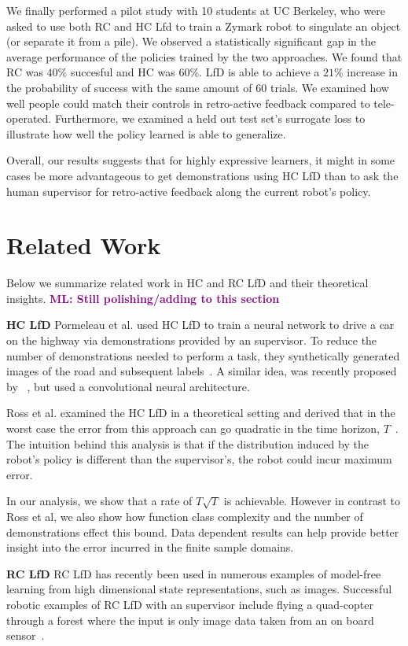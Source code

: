 \documentclass[10pt, conference]{ieeeconf}      %
\newcommand{\ns}{HC LfD }
\newcommand{\nc}{RC LfD }
\newcommand{\mlnote}[1]{\ifthenelse{ \boolean{include-notes}}%
 {\textcolor{purple}{\textbf{ML: #1}}}{}}
\begin{document}
We finally performed a pilot study with 10 students at UC Berkeley, who were asked to use both RC and HC Lfd to train a Zymark robot to singulate an object (or separate it from a pile). We observed a statistically significant gap in the average performance of the policies trained by the two approaches. We found that RC was $40\%$ succesful and HC was $60\%$.  LfD is able to achieve a $21 \%$ increase in the probability of success with the same amount of $60$ trials. We examined how well people could match their controls in retro-active feedback compared to tele-operated. Furthermore, we examined a held out test set's surrogate loss to illustrate how well the policy learned is able to generalize.


Overall, our results suggests that for highly expressive learners, it might in some cases be more advantageous to get demonstrations using HC LfD than to ask the human supervisor for retro-active feedback  along the current robot's policy.

\section{Related Work}
Below we summarize related work in HC and RC LfD and their theoretical insights. \mlnote{Still polishing/adding to this section}

\noindent \textbf {\ns}
Pormeleau et al. used \ns to train a neural network to drive a car on the highway via demonstrations provided by an supervisor. To reduce the number of demonstrations needed to perform a task, they synthetically generated  images of the road and subsequent labels~\cite{pomerleau1989alvinn}. A similar idea, was recently proposed by ~\cite{NVIDEA}, but used a convolutional neural architecture. 

Ross et al. examined the \ns in a theoretical setting and derived that in the worst case the error from this approach can go quadratic in the time  horizon, $T$~\cite{ross2010efficient}. The intuition behind this analysis is that if the distribution induced by the robot's policy is different than the supervisor's, the robot could incur maximum error. 

In our analysis, we show that a rate of $T\sqrt{T}$ is achievable. However in contrast to Ross et al,  we also show how function class complexity and the number of demonstrations effect this bound. Data dependent results can help provide better insight into the error incurred in the finite sample domains. 

\noindent \textbf{\nc}
\nc has recently been used in numerous examples of model-free learning from high dimensional state representations, such as images. Successful robotic examples of \nc with an supervisor  include flying a quad-copter through a forest where the input is only image data taken from an on board sensor~\cite{ross2013learning}.
\end{document}
